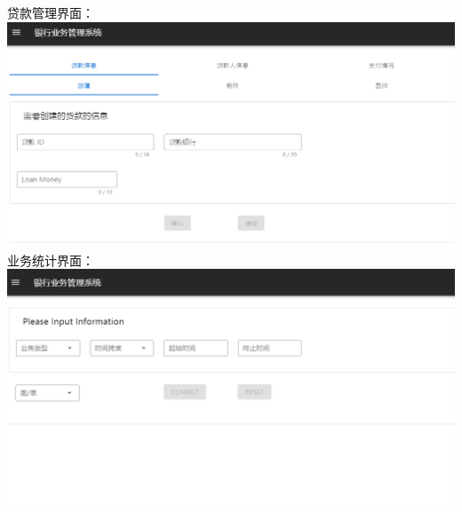 \documentclass{article}
\begin{document}
	贷款管理界面：\\
	\includegraphics*[scale=0.4]{4.png}\\
	业务统计界面：\\
	\includegraphics*[scale=0.4]{5.png}\\
\end{document}
